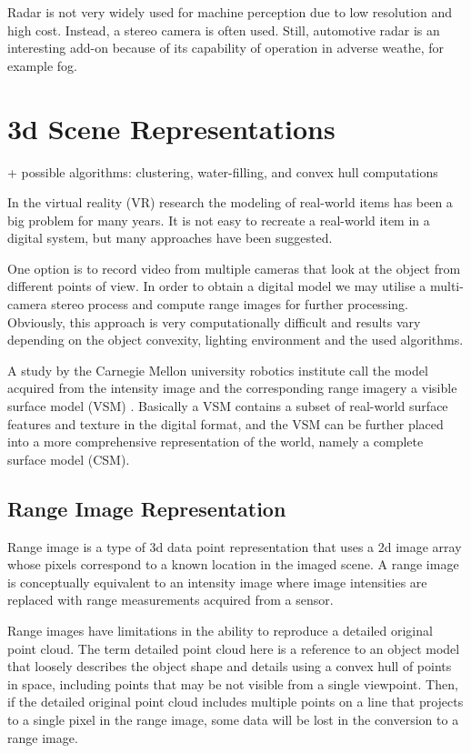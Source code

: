 \documentclass[12pt,a4paper,oneside,pdftex]{report}
\begin{document}
Radar is not very widely used for machine perception due to low resolution and high cost. Instead, a stereo camera is often used. Still, automotive radar is an interesting add-on because of its capability of operation in adverse weathe, for example fog. 


\section{3d Scene Representations}
\label{section:3d_scene_representations}
+ possible algorithms: clustering, water-filling, and convex hull computations

In the virtual reality (VR) research the modeling of real-world items has been a big problem for many years. 
It is not easy to recreate a real-world item in a digital system, but many approaches have been suggested.

One option is to record video from multiple cameras that look at the object from different points of view. In order to obtain a digital model we may utilise a multi-camera stereo process and compute range images for further processing. Obviously, this approach is very computationally difficult and results vary depending on the object convexity, lighting environment and the used algorithms.  

A study by the Carnegie Mellon university robotics institute call the model acquired from the intensity image and the corresponding range imagery a visible surface model (VSM) \cite{Rander97}. Basically a VSM contains a subset of real-world surface features and texture in the digital format, and the VSM can be further placed into a more comprehensive representation of the world, namely a complete surface model (CSM). 

\subsection{Range Image Representation}
\label{subsection:range_image_representation}

Range image is a type of 3d data point representation that uses a 2d image array whose pixels correspond to a known location in the imaged scene. A range image is conceptually equivalent to an intensity image where image intensities are replaced with range measurements acquired from a sensor.

Range images have limitations in the ability to reproduce a detailed original point cloud. The term detailed point cloud here is a reference to an object model that loosely describes the object shape and details using a convex hull of points in space, including points that may be not visible from a single viewpoint. Then, if the detailed original point cloud includes multiple points on a line that projects to a single pixel in the range image, some data will be lost in the conversion to a range image. 
\end{document}
